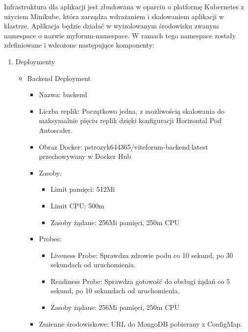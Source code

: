 \documentclass[12pt,a4paper]{article}
\begin{document}
Infrastruktura dla aplikacji jest zbudowana w oparciu o platformę Kubernetes z użyciem Minikube, która zarządza wdrażaniem i skalowaniem aplikacji w klastrze. Aplikacja będzie działać w wyizolowanym środowisku zwanym namespace o nazwie myforum-namespace. W ramach tego namespace zostały zdefiniowane i wdrożone następujące komponenty:
\begin{enumerate}
    \item Deploymenty
    \begin{itemize}
    \item Backend Deployment
        \begin{itemize}
        \item Nazwa: backend
        \item Liczba replik: Początkowo jedna, z możliwością skalowania do maksymalnie pięciu replik dzięki konfiguracji Horizontal Pod Autoscaler.
        \item Obraz Docker: pstrozyk644365/viteforum-backend:latest przechowywany w Docker Hub
        \item Zasoby:
                \begin{itemize}
                \item Limit pamięci: 512Mi
                \item Limit CPU: 500m
                \item  Zasoby żądane: 256Mi pamięci, 250m CPU
                \end{itemize}
        \item Probes:
                \begin{itemize}
                \item Liveness Probe: Sprawdza zdrowie podu co 10 sekund, po 30 sekundach od uruchomienia.
                \item Readiness Probe: Sprawdza gotowość do obsługi żądań co 5 sekund, po 10 sekundach od uruchomienia.
                \item  Zasoby żądane: 256Mi pamięci, 250m CPU
                \end{itemize}
        \item Zmienne środowiskowe: URL do MongoDB pobierany z ConfigMap.
        \end{itemize}



\end{itemize}
\end{enumerate}
\end{document}
